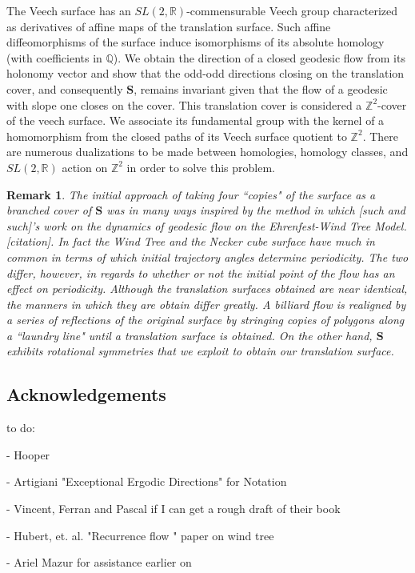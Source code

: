 \documentclass[]{article}
\newtheorem*{rem}{Remark}
\begin{document}
The Veech surface has an $SL(2,\mathbb{R})$-commensurable Veech group characterized as derivatives of affine maps of the translation surface. Such affine diffeomorphisms of the surface induce isomorphisms of its absolute homology (with coefficients in $\mathbb Q$). We obtain the direction of a closed geodesic flow from its holonomy vector and show that the odd-odd directions closing on the translation cover, and consequently $\mathbf S$, remains invariant given that the flow of a geodesic with slope one closes on the cover. This translation cover is considered a $\mathbb{Z}^2$-cover of the veech surface. We associate its fundamental group with the kernel of a homomorphism from the closed paths of its Veech surface quotient to $\mathbb{Z}^2$. There are numerous dualizations to be made between homologies, homology classes, and $SL(2,\mathbb{R})$ action on $\mathbb{Z}^2$ in order to solve this problem.

\begin{rem}
The initial approach of taking four ``copies" of the surface as a branched cover of $\mathbf S$ was in many ways inspired by the method in which [such and such]'s work on the dynamics of geodesic flow on the Ehrenfest-Wind Tree Model.[citation]. In fact the Wind Tree and the Necker cube surface have much in common in terms of which initial trajectory angles determine periodicity. The two differ, however, in regards to whether or not the initial point of the flow has an effect on periodicity. Although the translation surfaces obtained are near identical, the manners in which they are obtain differ greatly. A billiard flow is realigned by a series of reflections of the original surface by stringing copies of polygons along a ``laundry line" until a translation surface is obtained. On the other hand, $\mathbf S$ exhibits rotational symmetries that we exploit to obtain our translation surface.
\end{rem}
\subsection{Acknowledgements}
to do: 

- Hooper

- Artigiani "Exceptional Ergodic Directions" for Notation

- Vincent, Ferran and Pascal if I can get a rough draft of their book

- Hubert, et. al. "Recurrence flow " paper on wind tree

- Ariel Mazur for assistance earlier on
\end{document}
